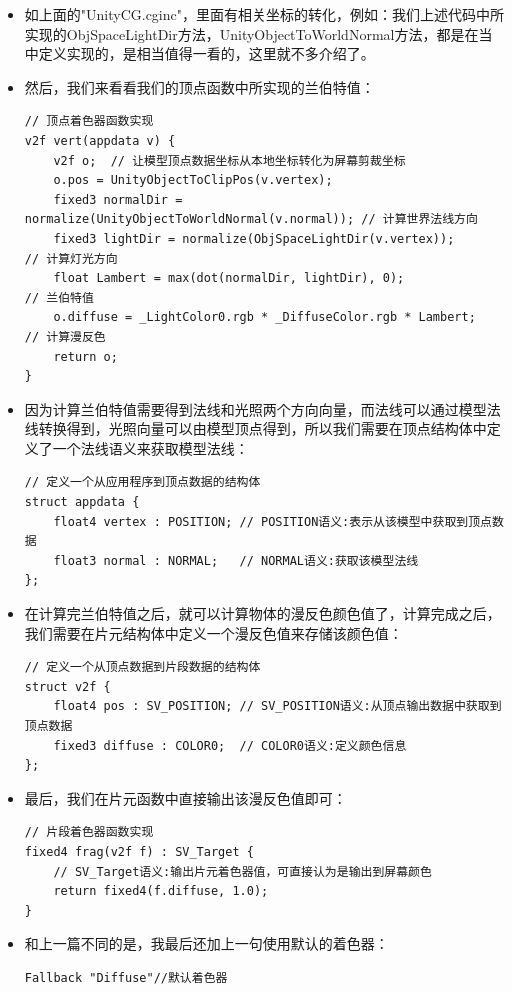 \documentclass[9pt, b5paper]{article}
\begin{document}
\begin{itemize}
\item 如上面的"UnityCG.cginc"，里面有相关坐标的转化，例如：我们上述代码中所实现的ObjSpaceLightDir方法，UnityObjectToWorldNormal方法，都是在当中定义实现的，是相当值得一看的，这里就不多介绍了。
\item 然后，我们来看看我们的顶点函数中所实现的兰伯特值：
\begin{verbatim}
// 顶点着色器函数实现  
v2f vert(appdata v) {  
    v2f o;  // 让模型顶点数据坐标从本地坐标转化为屏幕剪裁坐标  
    o.pos = UnityObjectToClipPos(v.vertex); 
    fixed3 normalDir = normalize(UnityObjectToWorldNormal(v.normal)); // 计算世界法线方向  
    fixed3 lightDir = normalize(ObjSpaceLightDir(v.vertex));          // 计算灯光方向  
    float Lambert = max(dot(normalDir, lightDir), 0);                 // 兰伯特值  
    o.diffuse = _LightColor0.rgb * _DiffuseColor.rgb * Lambert;       // 计算漫反色  
    return o;  
}
\end{verbatim}
\item 因为计算兰伯特值需要得到法线和光照两个方向向量，而法线可以通过模型法线转换得到，光照向量可以由模型顶点得到，所以我们需要在顶点结构体中定义了一个法线语义来获取模型法线：
\begin{verbatim}
// 定义一个从应用程序到顶点数据的结构体  
struct appdata {  
    float4 vertex : POSITION; // POSITION语义:表示从该模型中获取到顶点数据  
    float3 normal : NORMAL;   // NORMAL语义:获取该模型法线  
};
\end{verbatim}
\item 在计算完兰伯特值之后，就可以计算物体的漫反色颜色值了，计算完成之后，我们需要在片元结构体中定义一个漫反色值来存储该颜色值：
\begin{verbatim}
// 定义一个从顶点数据到片段数据的结构体  
struct v2f {  
    float4 pos : SV_POSITION; // SV_POSITION语义:从顶点输出数据中获取到顶点数据  
    fixed3 diffuse : COLOR0;  // COLOR0语义:定义颜色信息  
};
\end{verbatim}
\item 最后，我们在片元函数中直接输出该漫反色值即可：
\begin{verbatim}
// 片段着色器函数实现  
fixed4 frag(v2f f) : SV_Target {
    // SV_Target语义:输出片元着色器值，可直接认为是输出到屏幕颜色  
    return fixed4(f.diffuse, 1.0);  
}
\end{verbatim}
\item 和上一篇不同的是，我最后还加上一句使用默认的着色器：
\begin{verbatim}
Fallback "Diffuse"//默认着色器

\end{verbatim}
\end{itemize}
\end{document}
